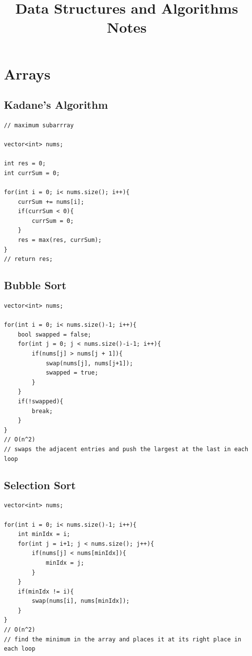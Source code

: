 \documentclass[11pt]{article}
\title{Data Structures and Algorithms Notes}
\author{}
\date{}
\begin{document}
\maketitle
\tableofcontents

\section{Arrays}

\subsection{Kadane's Algorithm}
\begin{minipage}{\linewidth}
\begin{lstlisting}
// maximum subarrray

vector<int> nums;

int res = 0;
int currSum = 0;

for(int i = 0; i< nums.size(); i++){
	currSum += nums[i];
	if(currSum < 0){
		currSum = 0;
	}
	res = max(res, currSum);
}
// return res;
\end{lstlisting}
\end{minipage}

\subsection{Bubble Sort}
\begin{minipage}{\linewidth}
\begin{lstlisting}
vector<int> nums;

for(int i = 0; i< nums.size()-1; i++){
	bool swapped = false;
	for(int j = 0; j < nums.size()-i-1; i++){
		if(nums[j] > nums[j + 1]){
			swap(nums[j], nums[j+1]);
			swapped = true;
		}
	}
	if(!swapped){
		break;
	}
}
// O(n^2)
// swaps the adjacent entries and push the largest at the last in each loop
\end{lstlisting}
\end{minipage}

\subsection{Selection Sort}
\begin{minipage}{\linewidth}
\begin{lstlisting}
vector<int> nums;

for(int i = 0; i< nums.size()-1; i++){
	int minIdx = i;
	for(int j = i+1; j < nums.size(); j++){
		if(nums[j] < nums[minIdx]){
			minIdx = j;
		}
	}
	if(minIdx != i){
		swap(nums[i], nums[minIdx]);
	}
}
// O(n^2)
// find the minimum in the array and places it at its right place in each loop
\end{lstlisting}
\end{minipage}
\end{document}
